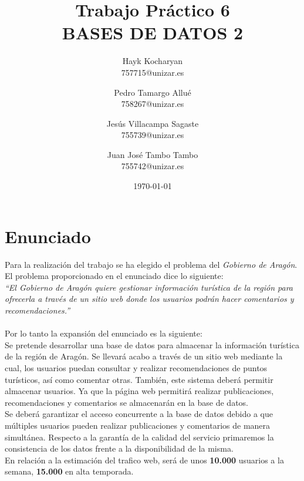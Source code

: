 \documentclass[10pt]{article}
\begin{document}
\begin{titlepage}
\title{{\Huge \textbf{
	Trabajo Práctico 6 \\
 	BASES DE DATOS 2
 		}}}
\author{
  Hayk Kocharyan\\
  757715@unizar.es
  \and
  Pedro Tamargo Allué\\
  758267@unizar.es
  \and
  Jesús Villacampa Sagaste\\
  755739@unizar.es
  \and
  Juan José Tambo Tambo\\
  755742@unizar.es
}

\date{\today}
\clearpage\maketitle
\thispagestyle{empty}

\end{titlepage}

\tableofcontents

\newpage 

\section{Enunciado}
Para la realización del trabajo se ha elegido el problema del \emph{Gobierno de Aragón}. El problema proporcionado en el enunciado dice lo siguiente:\\

\emph{``El Gobierno de Aragón quiere gestionar información turística de la región para ofrecerla a través de un sitio web donde los usuarios podrán hacer comentarios y recomendaciones.''}
\\\\
Por lo tanto la expansión del enunciado es la siguiente:\\

Se pretende desarrollar una base de datos para almacenar la información turística de la región de Aragón. Se llevará acabo a través de un sitio web mediante la cual, los usuarios puedan consultar y realizar recomendaciones  de puntos turísticos, así como comentar otras. También, este sistema deberá permitir almacenar usuarios. Ya que  la página web permitirá realizar publicaciones, recomendaciones y comentarios se almacenarán en la base de datos.\\
Se deberá garantizar el acceso concurrente a la base de datos debido a que múltiples usuarios pueden realizar publicaciones y comentarios de manera simultánea.
Respecto a la garantía de la calidad del servicio primaremos la consistencia de los datos frente a la disponibilidad de la misma.\\
En relación a la  estimación del trafico web, será de unos \textbf{10.000} usuarios a la semana, \textbf{15.000} en alta temporada.\\
\end{document}
